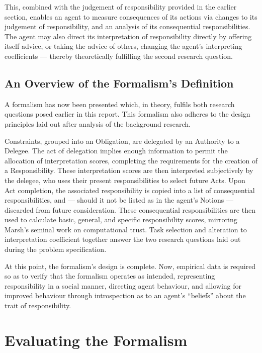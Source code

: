This, combined with the judgement of responsibility provided in the earlier section, enables an agent to measure consequences of its actions via changes to its judgement of responsibility, and an analysis of its consequential responsibilities. The agent may also direct its interpretation of responsibility directly by offering itself advice, or taking the advice of others, changing the agent's interpreting coefficients --- thereby theoretically fulfilling the second research question.\par

\subsection{An Overview of the Formalism's Definition}
A formalism has now been presented which, in theory, fulfils both research questions posed earlier in this report. This formalism also adheres to the design principles laid out after analysis of the background research.\par

Constraints, grouped into an Obligation, are delegated by an Authority to a Delegee. The act of delegation implies enough information to permit the allocation of interpretation scores, completing the requirements for the creation of a Responsibility. These interpretation scores are then interpreted subjectively by the delegee, who uses their present responsibilities to select future Acts. Upon Act completion, the associated responsibility is copied into a list of consequential responsibilities, and --- should it not be listed as in the agent's Notions --- discarded from future consideration. These consequential responsibilities are then used to calculate basic, general, and specific responsibility scores, mirroring Marsh's seminal work on computational trust. Task selection and alteration to interpretation coefficient together answer the two research questions laid out during the problem specification.\par

At this point, the formalism's design is complete. Now, empirical data is required so as to verify that the formalism operates as intended, representing responsibility in a social manner, directing agent behaviour, and allowing for improved behaviour through introspection as to an agent's ``beliefs'' about the trait of responsibility.\par

\section{Evaluating the Formalism}

